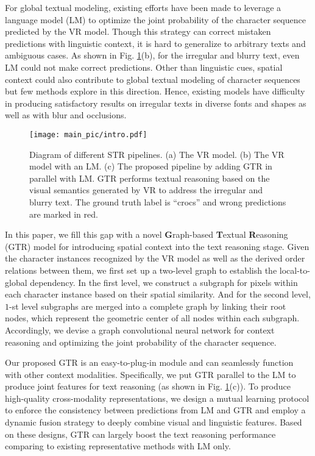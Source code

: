 \documentclass[letterpaper]{article} \usepackage{aaai22}  \usepackage{times}  \usepackage{helvet}  \usepackage{courier}  \usepackage[hyphens]{url}  \usepackage{graphicx} \urlstyle{rm} \def\UrlFont{\rm}  \usepackage{natbib}  \usepackage{caption} \DeclareCaptionStyle{ruled}{labelfont=normalfont,labelsep=colon,strut=off} \frenchspacing  \setlength{\pdfpagewidth}{8.5in}  \setlength{\pdfpageheight}{11in}
\begin{document}
For global textual modeling, existing efforts \cite{qiao2020seed,yu2020towards,fang2021read} have been made to leverage a language model (LM) \cite{jaderberg2014deep} to optimize the joint probability of the character sequence predicted by the VR model. Though this strategy can correct mistaken predictions with linguistic context, it is hard to generalize to arbitrary texts and ambiguous cases. As shown in Fig. \ref{fig:motivation}(b), for the irregular and blurry text, even LM could not make correct predictions. Other than linguistic cues, spatial context could also contribute to global textual modeling of character sequences but few methods explore in this direction. Hence, existing models have difficulty in producing satisfactory results on irregular texts in diverse fonts and shapes as well as with blur and occlusions.



\begin{figure}[t]
	\centering
	\texttt{[image: main\_pic/intro.pdf]}
	\caption{Diagram of different STR pipelines. (a) The VR model. (b) The VR model with an LM. (c) The proposed pipeline by adding GTR in parallel with LM. GTR performs textual reasoning based on the visual semantics generated by VR to address the irregular and blurry text. The ground truth label is ``crocs'' and wrong predictions are marked in red. }
    

	\label{fig:motivation}
	\vspace{-5mm}
\end{figure}


In this paper, we fill this gap with a novel \textbf{G}raph-based \textbf{T}extual \textbf{R}easoning (GTR) model for introducing spatial context into the text reasoning stage.
Given the character instances recognized by the VR model as well as the derived order relations between them, we first set up a two-level graph to establish the local-to-global dependency. In the first level, we construct a subgraph for pixels within each character instance based on their spatial similarity. And for the second level, $1$-st level subgraphs are merged into a complete graph by linking their root nodes, which represent the geometric center of all nodes within each subgraph. Accordingly, we devise a graph convolutional neural network for context reasoning and optimizing the joint probability of the character sequence.

Our proposed GTR is an easy-to-plug-in module and can seamlessly function with other context modalities. Specifically, we put GTR parallel to the LM to produce joint features for text reasoning (as shown in Fig. \ref{fig:motivation}(c)). To produce high-quality cross-modality representations, we design a mutual learning protocol to enforce the consistency between predictions from LM and GTR and employ a dynamic fusion strategy \cite{yue2020robustscanner} to deeply combine visual and linguistic features. Based on these designs, GTR can largely boost the text reasoning performance comparing to existing representative methods with LM only.
\end{document}
